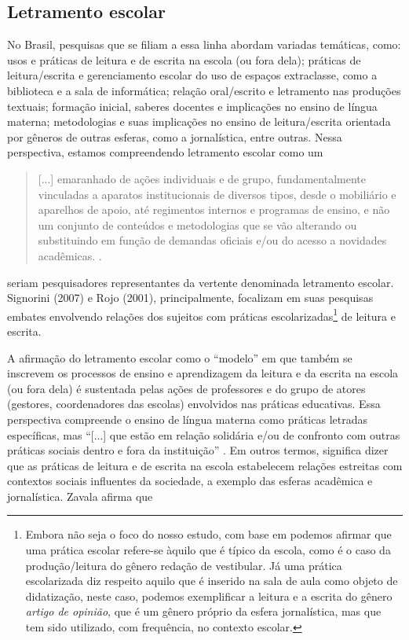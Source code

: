 \documentclass{textolivre}
\begin{document}
\subsection{Letramento escolar}\label{sec-escolar}
No Brasil, pesquisas que se filiam a essa linha abordam variadas temáticas, como: usos e práticas de leitura e de escrita na escola (ou fora dela); práticas de leitura/escrita e gerenciamento escolar do uso de espaços extraclasse, como a biblioteca e a sala de informática; relação oral/escrito e letramento nas produções textuais; formação inicial, saberes docentes e implicações no ensino de língua materna; metodologias e suas implicações no ensino de leitura/escrita orientada por gêneros de outras esferas, como a jornalística, entre outras. Nessa perspectiva, estamos compreendendo letramento escolar como um

\begin{quote}
   [...] emaranhado de ações individuais e de grupo, fundamentalmente vinculadas a aparatos institucionais de diversos tipos, desde o mobiliário e aparelhos de apoio, até regimentos internos e programas de ensino, e não um conjunto de conteúdos e metodologias que se vão alterando ou substituindo em função de demandas oficiais e/ou do acesso a novidades acadêmicas. \cite[p. 323]{signorini_letramento_2007}.
\end{quote}

\textcite{rojo_concepcoes_1995, rojo_letramento_2001, signorini_letramento_2007, bunzen_os_2010} seriam pesquisadores representantes da vertente denominada letramento escolar. Signorini (2007) e Rojo (2001), principalmente, focalizam em suas pesquisas embates envolvendo relações dos sujeitos com práticas escolarizadas\footnote{Embora não seja o foco do nosso estudo, com base em \textcite{rojo_letramento_2001} podemos afirmar que uma prática escolar refere-se àquilo que é típico da escola, como é o caso da produção/leitura do gênero redação de vestibular. Já uma prática escolarizada diz respeito aquilo que é inserido na sala de aula como objeto de didatização, neste caso, podemos exemplificar a leitura e a escrita do gênero \textit{artigo de opinião}, que é um gênero próprio da esfera jornalística, mas que tem sido utilizado, com frequência, no contexto escolar.} de leitura e escrita.

A afirmação do letramento escolar como o “modelo” em que também se inscrevem os processos de ensino e aprendizagem da leitura e da escrita na escola (ou fora dela) é sustentada pelas ações de professores e do grupo de atores (gestores, coordenadores das escolas) envolvidos nas práticas educativas. Essa perspectiva compreende o ensino de língua materna como práticas letradas específicas, mas “[...] que estão em relação solidária e/ou de confronto com outras práticas sociais dentro e fora da instituição” \cite[p. 323]{signorini_letramento_2007}. Em outros termos, significa dizer que as práticas de leitura e de escrita na escola estabelecem relações estreitas com contextos sociais influentes da sociedade, a exemplo das esferas acadêmica e jornalística. Zavala afirma que
\end{document}
